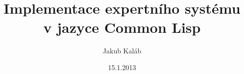 \documentclass[12pt]{article}
\title{Implementace expertního systému v jazyce Common Lisp}
\author{Jakub Kaláb}
\date{15.1.2013}
\begin{document}
\maketitle
\renewcommand\listoflistingscaption{Seznam příkladů}
\renewcommand\listingscaption{Příklad}
\listoflistings
{}






\clearpage
\renewcommand\refname{Seznam použité literatury}


\end{document}
